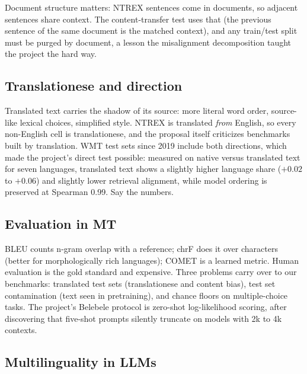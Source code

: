 Document structure matters: NTREX sentences come in documents, so adjacent
sentences share context. The content-transfer test uses that (the
previous sentence of the same document is the matched context), and any
train/test split must be purged by document, a lesson the misalignment decomposition
taught the project the hard way.

\subsection{Translationese and direction}

Translated text carries the shadow of its source: more literal word order,
source-like lexical choices, simplified style. NTREX is translated
\emph{from} English, so every non-English cell is translationese, and the
proposal itself criticizes benchmarks built by translation. WMT test sets
since 2019 include both directions, which made the project's direct test
possible: measured on native versus translated text for seven languages,
translated text shows a slightly higher language share ($+0.02$ to $+0.06$)
and slightly lower retrieval alignment, while model ordering is preserved at
Spearman 0.99. Say the numbers.

\subsection{Evaluation in MT}

BLEU counts n-gram overlap with a reference; chrF does it over characters
(better for morphologically rich languages); COMET is a learned metric. Human
evaluation is the gold standard and expensive. Three problems carry over to
our benchmarks: translated test sets (translationese and content bias), test
set contamination (text seen in pretraining), and chance floors on
multiple-choice tasks. The project's Belebele protocol is zero-shot
log-likelihood scoring, after discovering that five-shot prompts silently
truncate on models with 2k to 4k contexts.

\subsection{Multilinguality in LLMs}

